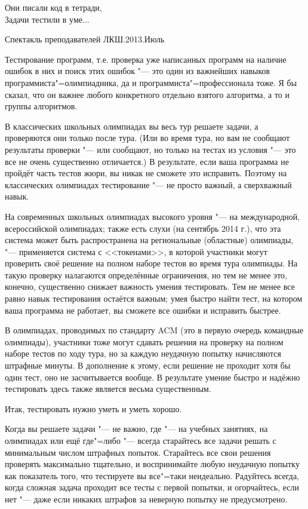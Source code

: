 
\epigraph{Они писали код в тетради,\\
Задачи тестили в уме...}{Спектакль преподавателей ЛКШ.2013.Июль}

Тестирование программ, т.е. проверка уже написанных программ на наличие ошибок в них и поиск этих ошибок "--- 
это один из важнейших навыков программиста"=олимпиадника, да и программиста"=профессионала тоже. 
Я бы сказал, что он важнее любого конкретного отдельно взятого алгоритма, а то и группы алгоритмов.

В классических школьных олимпиадах вы весь тур решаете задачи, а проверяются они только после тура. 
(Или во время тура, но вам не сообщают результаты проверки "--- или сообщают, но только на тестах из условия "--- это все не очень существенно отличается.) 
В результате, если ваша программа не пройдёт часть тестов жюри, вы никак не сможете это исправить. 
Поэтому на классических олимпиадах тестирование "--- не просто важный, а сверхважный навык.

На современных школьных олимпиадах высокого уровня "--- на международной, всероссийской олимпиадах; также есть слухи (на сентябрь 2014 г.), 
что эта система может быть распространена на региональные (областные) олимпиады, "--- применяется система с <<токенами>>, 
в которой участники могут проверить своё решение на полном наборе тестов во время тура олимпиады.
На такую проверку налагаются определённые ограничения, но тем не менее это, конечно, существенно снижает важность умения тестировать.
Тем не менее все равно навык тестирования остаётся важным; умея быстро найти тест, на котором ваша программа не работает, вы сможете все ошибки
и исправить быстрее.

В олимпиадах, проводимых по стандарту ACM (это в первую очередь командные олимпиады), участники тоже могут сдавать решения на проверку на полном наборе тестов по ходу тура, но за каждую неудачную попытку начисляются штрафные минуты. 
В дополнение к этому, если решение не проходит хотя бы один тест, оно не засчитывается вообще. 
В результате умение быстро и надёжно тестировать здесь также является весьма существенным.

Итак, тестировать нужно уметь и уметь хорошо.

Когда вы решаете задачи "--- не важно, где "--- на учебных занятиях, на олимпиадах или ещё где"=либо "--- всегда старайтесь все задачи решать с минимальным числом штрафных попыток. Старайтесь все свои решения проверять максимально тщательно, и воспринимайте любую неудачную попытку как показатель того, что тестируете вы все"=таки неидеально. Радуйтесь всегда, когда сложная задача проходит все тесты с первой попытки, и огорчайтесь, если нет "--- даже если никаких штрафов за неверную попытку не предусмотрено.

